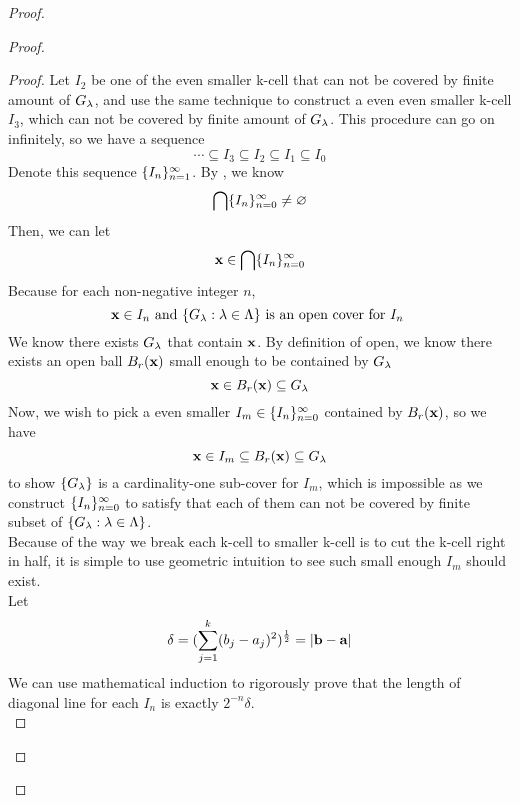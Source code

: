 \documentclass{report}
\begin{document}
\begin{proof}
\begin{proof}
\begin{proof}
Let $I_2$ be one of the even smaller k-cell that can not be covered by finite amount of  $G_\lambda $, and use the same technique to construct a even even smaller k-cell $I_3$, which can not be covered by finite amount of $G_\lambda $. This procedure can go on infinitely, so we have a sequence
\begin{equation}
\cdots \subseteq I_3 \subseteq I_2\subseteq I_1\subseteq I_0
\end{equation}
Denote this sequence $\{ I_n \}_{n=1}^\infty$. By , we know 
\begin{equation}
\bigcap \{ I_n \}_{n=0}^\infty \neq \varnothing
\end{equation}
Then, we can let
\begin{equation}
\textbf{x}\in \bigcap \{ I_n \}_{n=0}^\infty
\end{equation}
Because for each non-negative integer $n$, 
\begin{equation}
\textbf{x}\in I_n\text{ and }\{ G_\lambda :\lambda \in\Lambda  \}\text{ is an open cover for $I_n$ }
\end{equation}
We know there exists $G_\lambda $ that contain $\textbf{x}$. By definition of open, we know there exists an open ball $B_r(\textbf{x})$ small enough to be contained by $G_\lambda $
\begin{equation}
\textbf{x}\in B_r(\textbf{x})\subseteq G_\lambda 
\end{equation}
Now, we wish to pick a even smaller $I_m \in \{ I_n \}_{n=0}^\infty$ contained by $B_r(\textbf{x})$, so we have
\begin{equation}
\textbf{x}\in I_m \subseteq B_r(\textbf{x})\subseteq G_\lambda 
\end{equation}
to show $\{ G_\lambda  \}$ is a cardinality-one sub-cover for $I_m$, which is impossible as we construct $\{ I_n \}_{n=0}^\infty$ to satisfy that each of them can not be covered by finite subset of $\{ G_\lambda :\lambda \in \Lambda  \}$.\\

Because of the way we break each k-cell to smaller k-cell is to cut the k-cell right in half, it is simple to use geometric intuition to see such small enough $I_m$ should exist.\\

Let
\begin{equation}
\delta=(\sum_{j=1}^k (b_j-a_j)^2)^{\frac{1}{2}}=|\textbf{b}-\textbf{a}|
\end{equation}
We can use mathematical induction to rigorously prove that the length of diagonal line for each $I_n$ is exactly $2^{-n}\delta$.\\


\end{proof}
\end{proof}
\end{proof}
\end{document}
